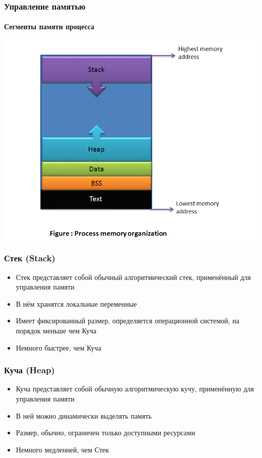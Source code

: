 \documentclass[14pt,pdf,hyperref={unicode}]{beamer}
\begin{document}
\begin{frame}[fragile]
\frametitle{Управление памятью} 
\framesubtitle{Сегменты памяти процесса}
\begin{center}
\includegraphics[width=0.8\linewidth]{images/process_memory_organization.png}
\end{center}
\end{frame}

\begin{frame}[fragile]
\frametitle{Стек (Stack)} 
\begin{itemize}
\item Стек представляет собой обычный алгоритмический стек, применённый для управления памяти
\item В нём хранятся локальные переменные
\item Имеет фиксированный размер, определяется операционной системой, на порядок меньше чем Куча
\item Немного быстрее, чем Куча
\end{itemize}
\end{frame}

\begin{frame}[fragile]
\frametitle{Куча (Heap)} 
\begin{itemize}
\item Куча представляет собой обычную алгоритмическую кучу, применённую для управления памяти
\item В ней можно динамически выделять память
\item Размер, обычно, ограничен только доступными ресурсами
\item Немного медленней, чем Стек
\end{itemize}
\end{frame}
\end{document}
